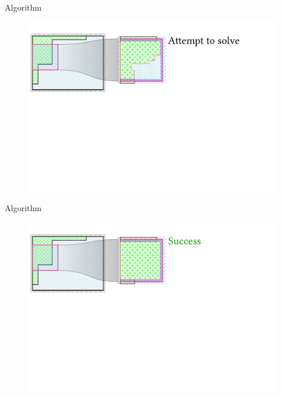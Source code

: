 \documentclass{beamer}
\begin{document}
  \begin{frame}[fragile]{Algorithm}
    \begin{figure}
      \includegraphics[width=\textwidth]{figs/poms_alg3.pdf}
    \end{figure}
  \end{frame}

  \begin{frame}[fragile]{Algorithm}
    \begin{figure}
      \includegraphics[width=\textwidth]{figs/poms_alg4.pdf}
    \end{figure}
  \end{frame}
\end{document}
